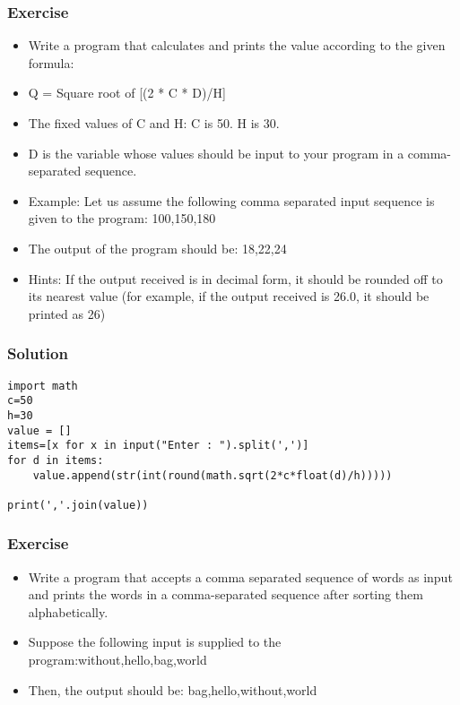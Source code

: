 \begin{frame}[fragile]\frametitle{Exercise}
  \begin{itemize}
  \item Write a program that calculates and prints the value according to the given formula:
  \item Q = Square root of [(2 * C * D)/H]
  \item The fixed values of C and H: C is 50. H is 30.
  \item D is the variable whose values should be input to your program in a comma-separated sequence.
  \item Example: Let us assume the following comma separated input sequence is given to the program: 100,150,180
  \item The output of the program should be: 18,22,24
  \item Hints: If the output received is in decimal form, it should be rounded off to its nearest value (for example, if the output received is 26.0, it should be printed as 26)
  \end{itemize}  
\end{frame}

\begin{frame}[fragile]\frametitle{Solution}
  \begin{lstlisting}
import math
c=50
h=30
value = []
items=[x for x in input("Enter : ").split(',')]
for d in items:
    value.append(str(int(round(math.sqrt(2*c*float(d)/h)))))

print(','.join(value))
  \end{lstlisting}
\end{frame}



\begin{frame}[fragile]\frametitle{Exercise}
  \begin{itemize}
  \item Write a program that accepts a comma separated sequence of words as input and prints the words in a comma-separated sequence after sorting them alphabetically.
  \item Suppose the following input is supplied to the program:without,hello,bag,world
  \item Then, the output should be: bag,hello,without,world
  \end{itemize}  
\end{frame}

